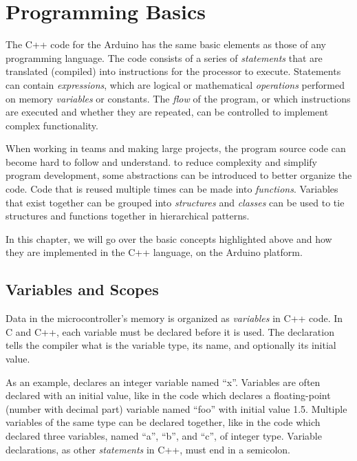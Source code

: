 
\chapter{Programming Basics}

The C++ code for the Arduino has the same basic elements as those of any programming language. 
The code consists of a series of \emph{statements} that are translated (compiled) into instructions for the processor to execute.
Statements can contain \emph{expressions}, which are logical or mathematical \emph{operations} performed on memory \emph{variables} or constants.
The \emph{flow} of the program, or which instructions are executed and whether they are repeated, can be controlled to implement complex functionality.

When working in teams and making large projects, the program source code can become hard to follow and understand.
to reduce complexity and simplify program development, some abstractions can be introduced to better organize the code.
Code that is reused multiple times can be made into \emph{functions}.
Variables that exist together can be grouped into \emph{structures} and \emph{classes} can be used to tie structures and functions together in hierarchical patterns.

In this chapter, we will go over the basic concepts highlighted above and how they are implemented in the C++ language, on the Arduino platform.

\section{Variables and Scopes}
Data in the microcontroller's memory is organized as \emph{variables} in C++ code.
In C and C++, each variable must be declared before it is used.
The declaration tells the compiler what is the variable type, its name, and optionally its initial value.

As an example,  declares an integer variable named ``x''.
Variables are often declared with an initial value, like in the code  which declares a floating-point (number with decimal part) variable named ``foo'' with initial value \num{1.5}.
Multiple variables of the same type can be declared together, like in the code  which declared three variables, named ``a'', ``b'', and ``c'', of integer type.
Variable declarations, as other \emph{statements} in C++, must end in a semicolon.

